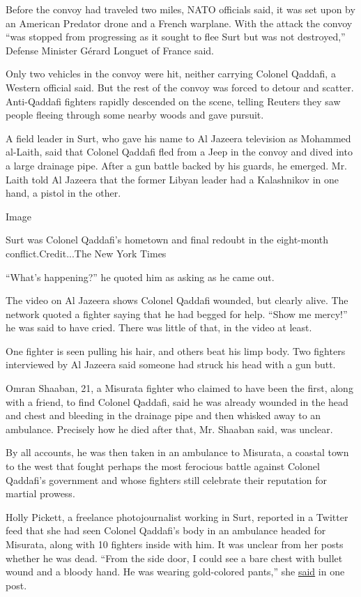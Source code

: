 Before the convoy had traveled two miles, NATO officials said, it was
set upon by an American Predator drone and a French warplane. With the
attack the convoy ``was stopped from progressing as it sought to flee
Surt but was not destroyed,'' Defense Minister Gérard Longuet of France
said.

Only two vehicles in the convoy were hit, neither carrying Colonel
Qaddafi, a Western official said. But the rest of the convoy was forced
to detour and scatter. Anti-Qaddafi fighters rapidly descended on the
scene, telling Reuters they saw people fleeing through some nearby woods
and gave pursuit.

A field leader in Surt, who gave his name to Al Jazeera television as
Mohammed al-Laith, said that Colonel Qaddafi fled from a Jeep in the
convoy and dived into a large drainage pipe. After a gun battle backed
by his guards, he emerged. Mr. Laith told Al Jazeera that the former
Libyan leader had a Kalashnikov in one hand, a pistol in the other.

Image

Surt was Colonel Qaddafi's hometown and final redoubt in the eight-month
conflict.Credit...The New York Times

``What's happening?'' he quoted him as asking as he came out.

The video on Al Jazeera shows Colonel Qaddafi wounded, but clearly
alive. The network quoted a fighter saying that he had begged for help.
``Show me mercy!'' he was said to have cried. There was little of that,
in the video at least.

One fighter is seen pulling his hair, and others beat his limp body. Two
fighters interviewed by Al Jazeera said someone had struck his head with
a gun butt.

Omran Shaaban, 21, a Misurata fighter who claimed to have been the
first, along with a friend, to find Colonel Qaddafi, said he was already
wounded in the head and chest and bleeding in the drainage pipe and then
whisked away to an ambulance. Precisely how he died after that, Mr.
Shaaban said, was unclear.

By all accounts, he was then taken in an ambulance to Misurata, a
coastal town to the west that fought perhaps the most ferocious battle
against Colonel Qaddafi's government and whose fighters still celebrate
their reputation for martial prowess.

Holly Pickett, a freelance photojournalist working in Surt, reported in
a Twitter feed that she had seen Colonel Qaddafi's body in an ambulance
headed for Misurata, along with 10 fighters inside with him. It was
unclear from her posts whether he was dead. ``From the side door, I
could see a bare chest with bullet wound and a bloody hand. He was
wearing gold-colored pants,'' she
\href{http://twitter.com/\#!/hollypickett/status/127078287125131264}{said}
in one post.

